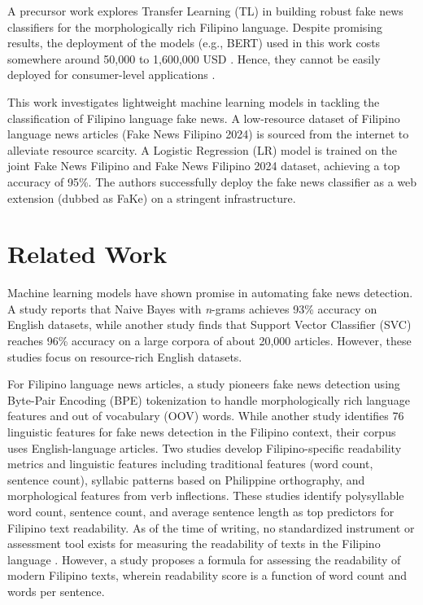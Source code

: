 \documentclass[conference]{IEEEtran}
\begin{document}
A precursor work \cite{b3} explores Transfer Learning (TL) in building robust fake news classifiers for the morphologically rich Filipino language. Despite promising results, the deployment of the models (e.g., BERT) used in this work costs somewhere around 50,000 to 1,600,000 USD \cite{b4}. Hence, they cannot be easily deployed for consumer-level applications \cite{b3, b4}.

This work investigates lightweight machine learning models in tackling the classification of Filipino language fake news. A low-resource dataset of Filipino language news articles (Fake News Filipino 2024) is sourced from the internet to alleviate resource scarcity. A Logistic Regression (LR) model is trained on the joint Fake News Filipino and Fake News Filipino 2024 dataset, achieving a top accuracy of 95\%. The authors successfully deploy the fake news classifier as a web extension (dubbed as FaKe) on a stringent infrastructure.

\section{Related Work}

Machine learning models have shown promise in automating fake news detection. A study \cite{b5} reports that Naive Bayes with \textit{n}-grams achieves 93\% accuracy on English datasets, while another study \cite{b6} finds that Support Vector Classifier (SVC) reaches 96\% accuracy on a large corpora of about 20,000 articles. However, these studies focus on resource-rich English datasets.

For Filipino language news articles, a study \cite{b3} pioneers fake news detection using Byte-Pair Encoding (BPE) tokenization to handle morphologically rich language features and out of vocabulary (OOV) words. While another study \cite{b7} identifies 76 linguistic features for fake news detection in the Filipino context, their corpus uses English-language articles. Two studies \cite{b8, b9} develop Filipino-specific readability metrics and linguistic features including traditional features (word count, sentence count), syllabic patterns based on Philippine orthography, and morphological features from verb inflections. These studies identify polysyllable word count, sentence count, and average sentence length as top predictors for Filipino text readability. As of the time of writing, no standardized instrument or assessment tool exists for measuring the readability of texts in the Filipino language \cite{b8}. However, a study \cite{b10} proposes a formula for assessing the readability of modern Filipino texts, wherein readability score is a function of word count and words per sentence.
\end{document}
